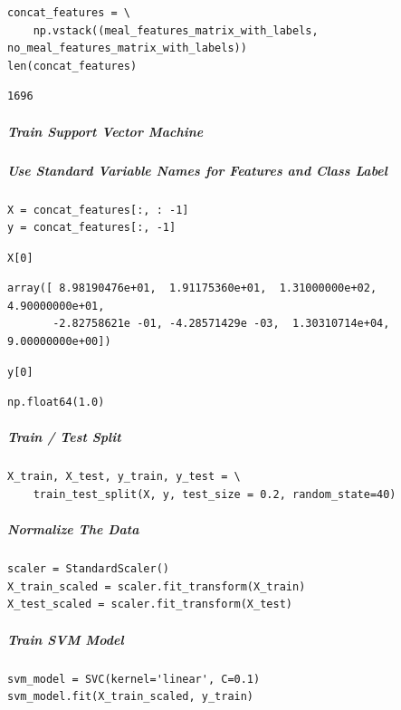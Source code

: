 \begin{verbatim}
concat_features = \
    np.vstack((meal_features_matrix_with_labels, no_meal_features_matrix_with_labels))
len(concat_features)
\end{verbatim}

\begin{verbatim}
1696
\end{verbatim}

\subparagraph{Train Support Vector Machine}

\subparagraph{Use Standard Variable Names for Features and Class Label}

\begin{verbatim}
X = concat_features[:, : -1]
y = concat_features[:, -1]
\end{verbatim}

\begin{verbatim}
X[0]
\end{verbatim}

\begin{verbatim}
array([ 8.98190476e+01,  1.91175360e+01,  1.31000000e+02,  4.90000000e+01,
       -2.82758621e -01, -4.28571429e -03,  1.30310714e+04,  9.00000000e+00])
\end{verbatim}

\begin{verbatim}
y[0]
\end{verbatim}

\begin{verbatim}
np.float64(1.0)
\end{verbatim}

\subparagraph{Train / Test Split}

\begin{verbatim}
X_train, X_test, y_train, y_test = \
    train_test_split(X, y, test_size = 0.2, random_state=40)
\end{verbatim}

\subparagraph{Normalize The Data}

\begin{verbatim}
scaler = StandardScaler()
X_train_scaled = scaler.fit_transform(X_train)
X_test_scaled = scaler.fit_transform(X_test)
\end{verbatim}

\subparagraph{Train SVM Model}

\begin{verbatim}
svm_model = SVC(kernel='linear', C=0.1)
svm_model.fit(X_train_scaled, y_train)
\end{verbatim}

